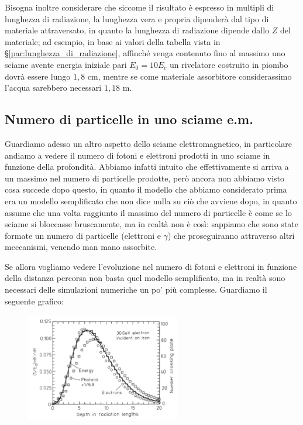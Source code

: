 
Bisogna inoltre considerare che siccome il risultato è espresso in multipli di lunghezza di radiazione, la lunghezza vera e propria dipenderà dal tipo di materiale attraversato, in quanto la lunghezza di radiazione dipende dallo $Z$ del materiale; ad esempio, in base ai valori della tabella vista in \S\ref{par:lunghezza_di_radiazione}, affinché venga contenuto fino al massimo uno sciame avente energia iniziale pari $E_0=10E_c$ un rivelatore costruito in piombo dovrà essere lungo $1,8$ cm, mentre se come materiale assorbitore considerassimo l'acqua sarebbero necessari $1,18$ m. %

\subsection{Numero di particelle in uno sciame e.m.}

Guardiamo adesso un altro aspetto dello sciame elettromagnetico, in particolare andiamo a vedere il numero di fotoni e elettroni prodotti in uno sciame in funzione della profondità. Abbiamo infatti intuito che effettivamente si arriva a un massimo nel numero di particelle prodotte, però ancora non abbiamo visto cosa succede dopo questo, in quanto il modello che abbiamo considerato prima era un modello semplificato che non dice nulla su ciò che avviene dopo, in quanto assume che una volta raggiunto il massimo del numero di particelle è come se lo sciame si bloccasse bruscamente, ma in realtà non è così: sappiamo che sono state formate un numero di particelle (elettroni e $\gamma$) che proseguiranno attraverso altri meccanismi, venendo man mano assorbite.

Se allora vogliamo vedere l'evoluzione nel numero di fotoni e elettroni in funzione della distanza percorsa non basta quel modello semplificato, ma in realtà sono necessari delle simulazioni numeriche un po' più complesse. Guardiamo il seguente grafico:

\begin{figure}[H]
    \centering
    \includegraphics[width=0.6\textwidth]{immagini/numero_particelle_sciame_elettromagnetico.png}
\end{figure}

